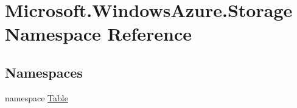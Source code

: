 \hypertarget{namespaceMicrosoft_1_1WindowsAzure_1_1Storage}{}\section{Microsoft.\+Windows\+Azure.\+Storage Namespace Reference}
\label{namespaceMicrosoft_1_1WindowsAzure_1_1Storage}
\subsection*{Namespaces}
\begin{DoxyCompactItemize}
\item 
namespace \hyperlink{namespaceMicrosoft_1_1WindowsAzure_1_1Storage_1_1Table}{Table}
\end{DoxyCompactItemize}

